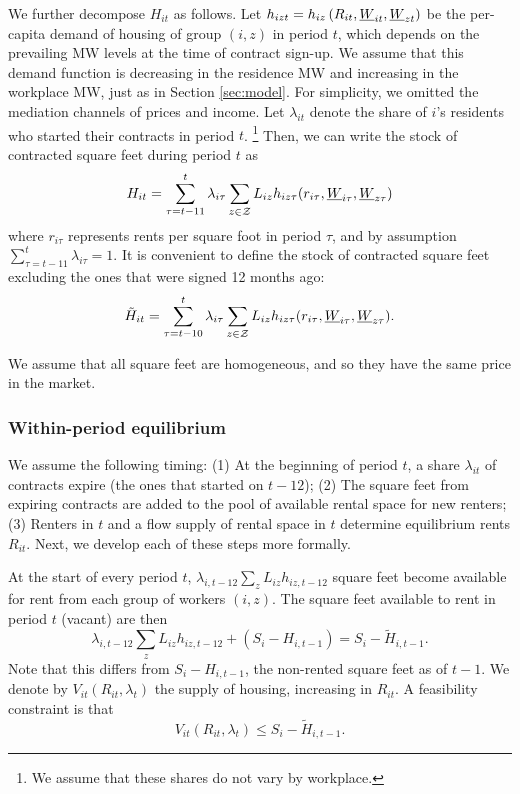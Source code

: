 We further decompose $H_{it}$ as follows.
Let $h_{izt} = h_{iz}\left(R_{it}, \underline{W}_{it}, \underline{W}_{zt}\right)$ be the 
per-capita demand of housing of group $(i,z)$ in period $t$,
which depends on the prevailing MW levels at the time of contract sign-up.
We assume that this demand function is decreasing in the residence MW and 
increasing in the workplace MW, just as in Section \ref{sec:model}.
For simplicity, we omitted the mediation channels of prices and income.
Let $\lambda_{it}$ denote the share of $i$'s residents who started their 
contracts in period $t$.%
\footnote{We assume that these shares do not vary by workplace.}
Then, we can write the stock of contracted square feet during period $t$ as
$$
H_{it} = \sum_{\tau = t - 11}^{t} \lambda_{i\tau} \sum_{z\in\mathcal{Z}} L_{iz} 
h_{iz\tau} (r_{i\tau}, \underline{W}_{i\tau}, \underline{W}_{z\tau})
$$
where 
$r_{i\tau}$ represents rents per square foot in period $\tau$, and
by assumption $\sum_{\tau = t - 11}^{t} \lambda_{i\tau} = 1$.
It is convenient to define the stock of contracted square feet excluding the ones 
that were signed 12 months ago:
$$
\tilde H_{it} = \sum_{\tau = t - 10}^{t} \lambda_{i\tau} \sum_{z\in\mathcal{Z}} L_{iz} 
h_{iz\tau} (r_{i\tau}, \underline{W}_{i\tau}, \underline{W}_{z\tau}) .
$$

We assume that all square feet are homogeneous, and so they have the same price 
in the market.

\subsubsection*{Within-period equilibrium}

We assume the following timing: 
(1) At the beginning of period $t$, a share $\lambda_{it}$ of contracts 
expire (the ones that started on $t-12$);
(2) The square feet from expiring contracts are added to the pool of available 
rental space for new renters;
(3) Renters in $t$ and a flow supply of rental space in $t$ determine equilibrium 
rents $R_{it}$.
Next, we develop each of these steps more formally.

At the start of every period $t$, $\lambda_{i,t-12} \sum_z L_{iz} h_{iz,t-12}$ 
square feet become available for rent from each group of workers $(i,z)$.
The square feet available to rent in period $t$ (vacant) are then
$$
\lambda_{i,t-12} \sum_z L_{iz} h_{iz,t-12} + (S_i - H_{i,t-1}) 
       = S_i - \tilde H_{i,t-1}.
$$
Note that this differs from $S_i - H_{i,t-1}$, the non-rented square feet as 
of $t-1$.
We denote by $V_{it}(R_{it}, \lambda_t)$ the supply of housing, increasing in 
$R_{it}$.
A feasibility constraint is that 
\begin{equation}\label{eq:feasibility}
    V_{it}(R_{it}, \lambda_t) \leq S_i - \tilde H_{i,t-1} .
\end{equation}

